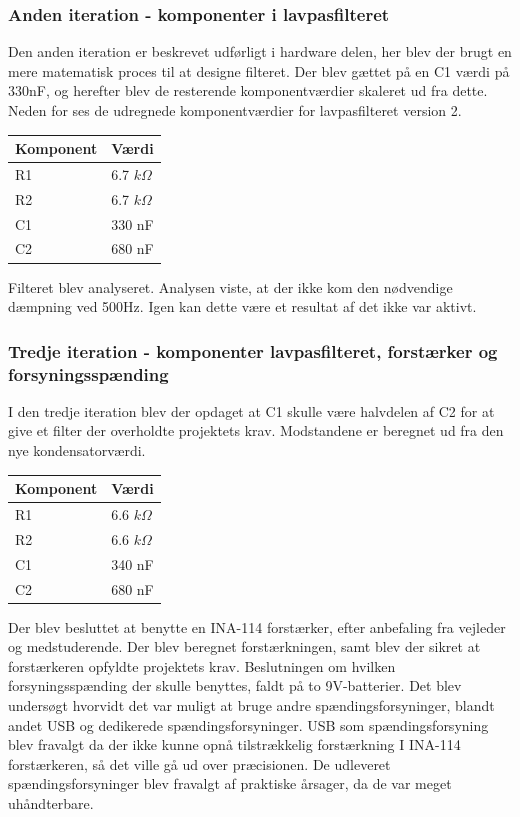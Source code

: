\subsubsection{Anden iteration - komponenter i lavpasfilteret}
Den anden iteration er beskrevet udførligt i hardware delen, her blev der brugt en mere matematisk proces til at designe filteret. Der blev gættet på en C1 værdi på 330nF, og herefter blev de resterende komponentværdier skaleret ud fra dette. Neden for ses de udregnede komponentværdier for lavpasfilteret version 2.
\begin{table}[H]
\begin{tabular}{| l | l |}
   \hline
   Komponent & Værdi\\ \hline
   R1 & 6.7 $k\Omega$ \\ \hline
   R2 & 6.7 $k\Omega$ \\ \hline
   C1 & 330 nF\\\hline
   C2 & 680 nF\\\hline
\end{tabular}
\end{table}
Filteret blev analyseret. Analysen viste, at der ikke kom den nødvendige dæmpning ved 500Hz. Igen kan dette være et resultat af det ikke var aktivt. 
\subsubsection{Tredje iteration - komponenter lavpasfilteret, forstærker og forsyningsspænding}
I den tredje iteration blev der opdaget at C1 skulle være halvdelen af C2 for at give et filter der overholdte projektets krav. Modstandene er beregnet ud fra den nye kondensatorværdi.
\begin{table}[H]
\begin{tabular}{| l | l |}
   \hline
   Komponent & Værdi\\ \hline
   R1 & 6.6 $k\Omega$ \\ \hline
   R2 & 6.6 $k\Omega$ \\ \hline
   C1 & 340 nF\\\hline
   C2 & 680 nF\\\hline
\end{tabular}
\end{table}
Der blev besluttet at benytte en INA-114 forstærker, efter anbefaling fra vejleder og medstuderende. Der blev beregnet forstærkningen, samt blev der sikret at forstærkeren opfyldte projektets krav. Beslutningen om hvilken forsyningsspænding der skulle benyttes, faldt på to 9V-batterier. Det blev undersøgt hvorvidt det var muligt at bruge andre spændingsforsyninger, blandt andet USB og dedikerede spændingsforsyninger. USB som spændingsforsyning blev fravalgt da der ikke kunne opnå tilstrækkelig forstærkning I INA-114 forstærkeren, så det ville gå ud over præcisionen. De udleveret spændingsforsyninger blev fravalgt af praktiske årsager, da de var meget uhåndterbare.
